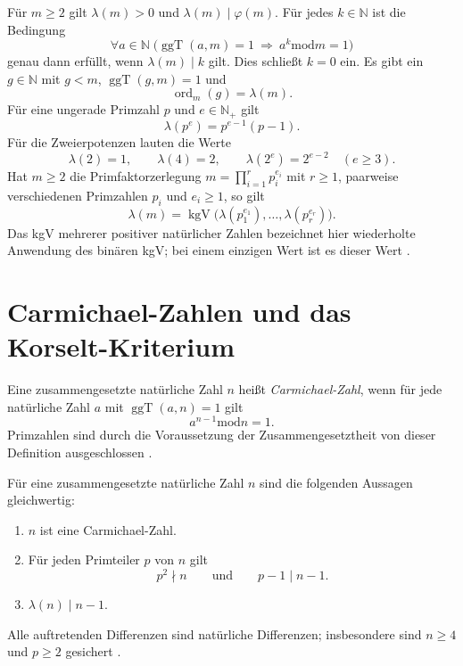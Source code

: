 \begin{theorem}
\label{b10guide:thm:carmichael-exponent}
Für $m\ge2$ gilt $\lambda(m)>0$ und
$\lambda(m)\mid\varphi(m)$.
Für jedes $k\in\mathbb N$ ist die Bedingung
\[
 \forall a\in\mathbb N\;
 \bigl(\operatorname{ggT}(a,m)=1\ \Longrightarrow\
       a^k\mathbin{\mathrm{mod}}m=1\bigr)
\]
genau dann erfüllt, wenn $\lambda(m)\mid k$ gilt.
Dies schließt $k=0$ ein.
Es gibt ein $g\in\mathbb N$ mit $g<m$,
$\operatorname{ggT}(g,m)=1$ und
\[
 \operatorname{ord}_m(g)=\lambda(m).
\]
Für eine ungerade Primzahl $p$ und $e\in\mathbb N_+$ gilt
\[
 \lambda(p^e)=p^{e-1}(p-1).
\]
Für die Zweierpotenzen lauten die Werte
\[
 \lambda(2)=1,\qquad \lambda(4)=2,\qquad
 \lambda(2^e)=2^{e-2}\quad(e\ge3).
\]
Hat $m\ge2$ die Primfaktorzerlegung
$m=\prod_{i=1}^{r}p_i^{e_i}$ mit $r\ge1$, paarweise verschiedenen
Primzahlen $p_i$ und $e_i\ge1$, so gilt
\[
 \lambda(m)=\operatorname{kgV}\bigl(
       \lambda(p_1^{e_1}),\ldots,\lambda(p_r^{e_r})\bigr).
\]
Das kgV mehrerer positiver natürlicher Zahlen bezeichnet hier
wiederholte Anwendung des binären kgV; bei einem einzigen Wert
ist es dieser Wert \cite{natcarmichael,natprimroots}.
\end{theorem}

\section{Carmichael-Zahlen und das Korselt-Kriterium}

\begin{definition}
\label{b10guide:def:carmichael-number}
Eine zusammengesetzte natürliche Zahl $n$ heißt
\emph{Carmichael-Zahl}, wenn für jede natürliche Zahl $a$ mit
$\operatorname{ggT}(a,n)=1$ gilt
\[
 a^{n-1}\mathbin{\mathrm{mod}}n=1.
\]
Primzahlen sind durch die Voraussetzung der Zusammengesetztheit
von dieser Definition ausgeschlossen \cite{natkorselt}.
\end{definition}

\begin{theorem}
\label{b10guide:thm:korselt}
Für eine zusammengesetzte natürliche Zahl $n$ sind die folgenden
Aussagen gleichwertig:
\begin{enumerate}
 \item $n$ ist eine Carmichael-Zahl.
 \item Für jeden Primteiler $p$ von $n$ gilt
       \[
        p^2\nmid n\qquad\text{und}\qquad p-1\mid n-1.
       \]
 \item $\lambda(n)\mid n-1$.
\end{enumerate}
Alle auftretenden Differenzen sind natürliche Differenzen;
insbesondere sind $n\ge4$ und $p\ge2$ gesichert
\cite{natkorselt,natcarmichael}.
\end{theorem}
